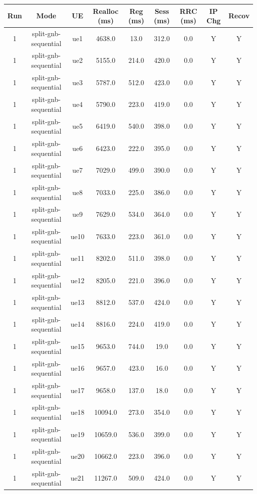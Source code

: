 \begin{table}[ht]
\centering
\begin{tabular}{|c|c|c|c|c|c|c|c|c|}
\hline
Run & Mode & UE & Realloc (ms) & Reg (ms) & Sess (ms) & RRC (ms) & IP Chg & Recov \\
\hline
1 & split-gnb-sequential & ue1 & 4638.0 & 13.0 & 312.0 & 0.0 & Y & Y \\
1 & split-gnb-sequential & ue2 & 5155.0 & 214.0 & 420.0 & 0.0 & Y & Y \\
1 & split-gnb-sequential & ue3 & 5787.0 & 512.0 & 423.0 & 0.0 & Y & Y \\
1 & split-gnb-sequential & ue4 & 5790.0 & 223.0 & 419.0 & 0.0 & Y & Y \\
1 & split-gnb-sequential & ue5 & 6419.0 & 540.0 & 398.0 & 0.0 & Y & Y \\
1 & split-gnb-sequential & ue6 & 6423.0 & 222.0 & 395.0 & 0.0 & Y & Y \\
1 & split-gnb-sequential & ue7 & 7029.0 & 499.0 & 390.0 & 0.0 & Y & Y \\
1 & split-gnb-sequential & ue8 & 7033.0 & 225.0 & 386.0 & 0.0 & Y & Y \\
1 & split-gnb-sequential & ue9 & 7629.0 & 534.0 & 364.0 & 0.0 & Y & Y \\
1 & split-gnb-sequential & ue10 & 7633.0 & 223.0 & 361.0 & 0.0 & Y & Y \\
1 & split-gnb-sequential & ue11 & 8202.0 & 511.0 & 398.0 & 0.0 & Y & Y \\
1 & split-gnb-sequential & ue12 & 8205.0 & 221.0 & 396.0 & 0.0 & Y & Y \\
1 & split-gnb-sequential & ue13 & 8812.0 & 537.0 & 424.0 & 0.0 & Y & Y \\
1 & split-gnb-sequential & ue14 & 8816.0 & 224.0 & 419.0 & 0.0 & Y & Y \\
1 & split-gnb-sequential & ue15 & 9653.0 & 744.0 & 19.0 & 0.0 & Y & Y \\
1 & split-gnb-sequential & ue16 & 9657.0 & 423.0 & 16.0 & 0.0 & Y & Y \\
1 & split-gnb-sequential & ue17 & 9658.0 & 137.0 & 18.0 & 0.0 & Y & Y \\
1 & split-gnb-sequential & ue18 & 10094.0 & 273.0 & 354.0 & 0.0 & Y & Y \\
1 & split-gnb-sequential & ue19 & 10659.0 & 536.0 & 399.0 & 0.0 & Y & Y \\
1 & split-gnb-sequential & ue20 & 10662.0 & 223.0 & 396.0 & 0.0 & Y & Y \\
1 & split-gnb-sequential & ue21 & 11267.0 & 509.0 & 424.0 & 0.0 & Y & Y \\

\end{tabular}
\end{table}
